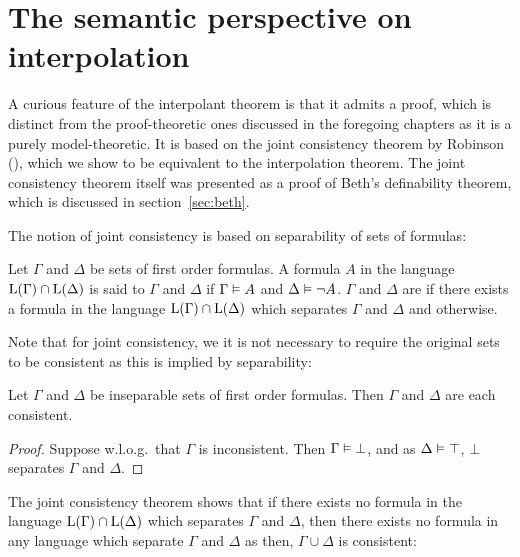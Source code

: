 
\chapter{The semantic perspective on interpolation}

A curious feature of the interpolant theorem is that it admits a proof, which is distinct from the proof-theoretic ones discussed in the foregoing chapters as it is a purely model-theoretic.
It is based on the joint consistency theorem by Robinson (\cite{robinson1956result}), which we show to be equivalent to the interpolation theorem.
The joint consistency theorem itself was presented as a proof of Beth's definability theorem, which is discussed in section~\ref{sec:beth}.

The notion of joint consistency is based on separability of sets of formulas:

\begin{defi}[Separability]
	Let $\Gamma$ and $\Delta$ be sets of first order formulas.
	A formula $A$ in the language $\operatorname{L}(\Gamma)\cap \operatorname{L}(\Delta)$ is said to  $\Gamma$ and $\Delta$ if $\Gamma \vDash A$ and $\Delta \vDash \lnot A$.
	$\Gamma$ and $\Delta$ are  if there exists a formula in the language $\operatorname{L}(\Gamma)\cap \operatorname{L}(\Delta)$ which separates $\Gamma$ and $\Delta$ and  otherwise.
\end{defi}

Note that for joint consistency, we it is not necessary to require the original sets to be consistent as this is implied by separability:

\begin{prop}
	\label{lemma:insep_consistent}
	Let $\Gamma$ and $\Delta$ be inseparable sets of first order formulas. Then $\Gamma$ and $\Delta$ are each consistent.
\end{prop}
\begin{proof}
	Suppose w.l.o.g.\ that $\Gamma$ is inconsistent. Then $\Gamma \vDash \bot$, and as $\Delta \vDash \top$, $\bot$ separates $\Gamma$ and $\Delta$.
\end{proof}

The joint consistency theorem shows that if there exists no formula in the language $\operatorname{L}(\Gamma)\cap \operatorname{L}(\Delta)$ which separates $\Gamma$ and $\Delta$, then there exists no formula in any language which separate $\Gamma$ and $\Delta$ as then, $\Gamma \cup \Delta$ is consistent:

